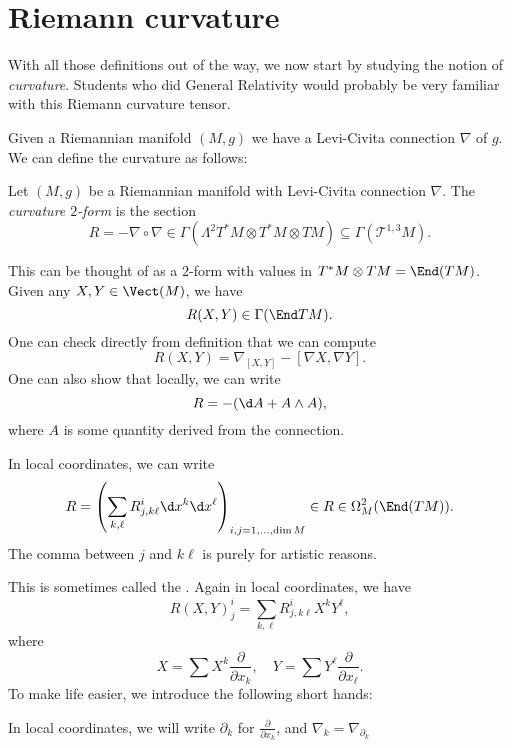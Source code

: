\documentclass[a4paper]{article}
\begin{document}
\section{Riemann curvature}
With all those definitions out of the way, we now start by studying the notion of \emph{curvature}. Students who did General Relativity would probably be very familiar with this Riemann curvature tensor.

Given a Riemannian manifold $(M, g)$ we have a Levi-Civita connection $\nabla$ of $g$. We can define the curvature as follows:
\begin{defi}[Curvature]
  Let $(M, g)$ be a Riemannian manifold with Levi-Civita connection $\nabla$. The \emph{curvature $2$-form} is the section
  \[
    R = - \nabla \circ \nabla \in \Gamma(\Lambda^2 T^*M \otimes T^*M \otimes TM) \subseteq \Gamma(\mathcal{T}^{1, 3}M).
  \]
\end{defi}
This can be thought of as a $2$-form with values in $T^*M \otimes TM = \End(TM)$. Given any $X, Y \in \Vect(M)$, we have
\[
  R(X, Y) \in \Gamma(\End TM) .
\]
One can check directly from definition that we can compute
\[
  R(X, Y) = \nabla_{[X, Y]} - [\nabla X, \nabla Y].
\]
One can also show that locally, we can write
\[
  R = -(\d A + A \wedge A),
\]
where $A$ is some quantity derived from the connection.

In local coordinates, we can write
\[
  R = \left(\sum_{k, \ell} R^i_{j, k\ell} \d x^k \d x^\ell\right)_{i, j = 1, \ldots, \dim M} \in R \in \Omega_M^2(\End(TM)).
\]
The comma between $j$ and $k\ell$ is purely for artistic reasons.

This is sometimes called the . Again in local coordinates, we have
\[
  R(X, Y)^i_j = \sum_{k, \ell} R^i_{j, k\ell} X^k Y^\ell,
\]
where
\[
  X = \sum X^k \frac{\partial}{\partial x_k},\quad Y = \sum Y^\ell \frac{\partial}{\partial x_\ell}.
\]
To make life easier, we introduce the following short hands:
\begin{notation}
  In local coordinates, we will write $\partial_k$ for $\frac{\partial}{\partial x_k}$, and $\nabla_k = \nabla_{\partial_k}$
\end{notation}
\end{document}
